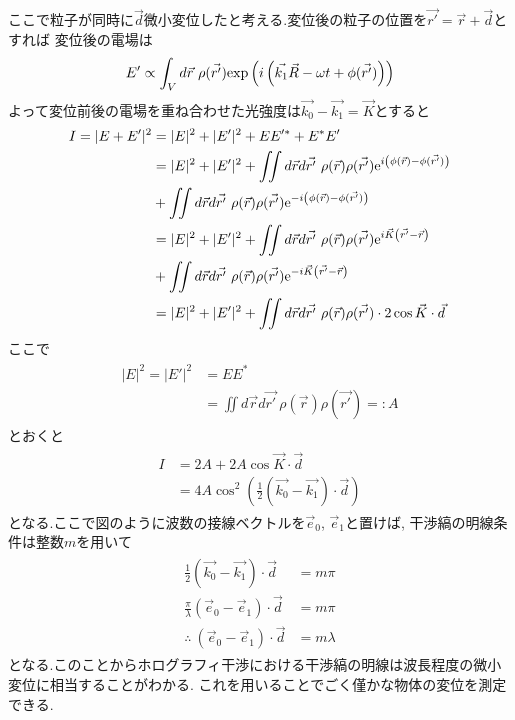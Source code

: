 ここで粒子が同時に$\vec{d}$微小変位したと考える.変位後の粒子の位置を$\vec{r'}=\vec{r}+\vec{d}$とすれば
変位後の電場は
\begin{align}
  E'\propto\int_Vd\vec{r}\ \rho(\vec{r'}){\rm exp}\left(i\left(\vec{k_1}\vec{R}-\omega t+\phi(\vec{r'})\right)\right)
\end{align}
よって変位前後の電場を重ね合わせた光強度は$\vec{k_0}-\vec{k_1}=\vec{K}$とすると
\begin{align}
  \begin{split}
    I=|E+E'|^2&=|E|^2+|E'|^2+EE'^*+E^*E'\\
    &=|E|^2+|E'|^2+\iint d\vec{r}d\vec{r'}\ \rho(\vec{r})\rho(\vec{r'}){\rm e}^{i\left(\phi(\vec{r})-\phi(\vec{r'})\right)}\\
    &+\iint d\vec{r}d\vec{r'}\ \rho(\vec{r})\rho(\vec{r'}){\rm e}^{-i\left(\phi(\vec{r})-\phi(\vec{r'})\right)}\\
    &=|E|^2+|E'|^2+\iint d\vec{r}d\vec{r'}\ \rho(\vec{r})\rho(\vec{r'}){\rm e}^{i\vec{K}\left(\vec{r'}-\vec{r}\right)}\\
    &+\iint d\vec{r}d\vec{r'}\ \rho(\vec{r})\rho(\vec{r'}){\rm e}^{-i\vec{K}\left(\vec{r'}-\vec{r}\right)}\\
    &=|E|^2+|E'|^2+\iint d\vec{r}d\vec{r'}\ \rho(\vec{r})\rho(\vec{r'})\cdot 2\cos\vec{K}\cdot\vec{d}
  \end{split}
\end{align}
ここで
\begin{align}
  \begin{split}
    |E|^2=|E'|^2&=EE^*\\
    &=\iint d\vec{r}d\vec{r'}\ \rho(\vec{r})\rho(\vec{r'})=:A
  \end{split}
\end{align}
とおくと
\begin{align}
  \begin{split}
    I&=2A+2A\cos\vec{K}\cdot\vec{d}\\
    &=4A\cos^2\left(\frac{1}{2}(\vec{k_0}-\vec{k_1})\cdot\vec{d}\right)
  \end{split}
\end{align}
となる.ここで図のように波数の接線ベクトルを$\vec{e}_0$, $\vec{e}_1$と置けば,
干渉縞の明線条件は整数$m$を用いて
\begin{align}
  \begin{split}
    \frac{1}{2}(\vec{k_0}-\vec{k_1})\cdot\vec{d}&=m\pi\\
    \frac{\pi}{\lambda}(\vec{e}_0-\vec{e}_1)\cdot\vec{d}&=m\pi\\
    \therefore\ (\vec{e}_0-\vec{e}_1)\cdot\vec{d}&=m\lambda
  \end{split}
\end{align}
となる.このことからホログラフィ干渉における干渉縞の明線は波長程度の微小変位に相当することがわかる.
これを用いることでごく僅かな物体の変位を測定できる.
